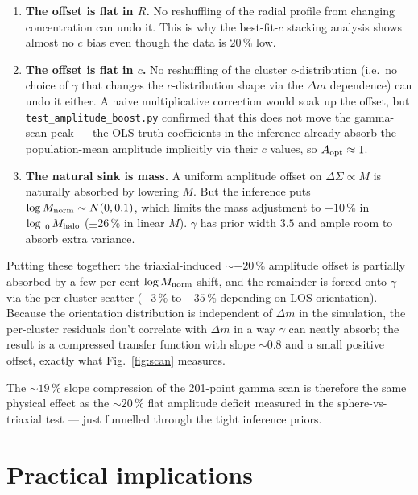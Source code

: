 \documentclass[11pt,a4paper]{article}
\newcommand{\DS}{\Delta\Sigma}
\newcommand{\dm}{\Delta m}
\begin{document}
\begin{enumerate}
\item \textbf{The offset is flat in $R$.}  No reshuffling of the radial
      profile from changing concentration can undo it.  This is why the
      best-fit-$c$ stacking analysis shows almost no $c$ bias even though
      the data is $20\,\%$ low.

\item \textbf{The offset is flat in $c$.}  No reshuffling of the cluster
      $c$-distribution (i.e.\ no choice of $\gamma$ that changes the
      $c$-distribution shape via the $\dm$ dependence) can undo it either.
      A naive multiplicative correction would soak up the offset, but
      \texttt{test\_amplitude\_boost.py} confirmed that this does not move
      the gamma-scan peak --- the OLS-truth coefficients in the inference
      already absorb the population-mean amplitude implicitly via their
      $c$ values, so $A_{\rm opt}\approx 1$.

\item \textbf{The natural sink is mass.}  A uniform amplitude offset on
      $\DS \propto M$ is naturally absorbed by lowering $M$.  But the
      inference puts $\log M_{\rm norm}\sim N(0,0.1)$, which limits the
      mass adjustment to $\pm 10\,\%$ in $\log_{10}M_{\rm halo}$
      ($\pm 26\,\%$ in linear $M$).  $\gamma$ has prior width $3.5$ and
      ample room to absorb extra variance.
\end{enumerate}

Putting these together: the triaxial-induced $\sim -20\,\%$ amplitude
offset is partially absorbed by a few per cent $\log M_{\rm norm}$ shift,
and the remainder is forced onto $\gamma$ via the per-cluster scatter
($-3\,\%$ to $-35\,\%$ depending on LOS orientation).  Because the
orientation distribution is independent of $\dm$ in the simulation, the
per-cluster residuals don't correlate with $\dm$ in a way $\gamma$ can
neatly absorb; the result is a compressed transfer function with slope
$\sim 0.8$ and a small positive offset, exactly what
Fig.~\ref{fig:scan} measures.

The $\sim 19\,\%$ slope compression of the 201-point gamma scan is therefore
the same physical effect as the $\sim 20\,\%$ flat amplitude deficit measured
in the sphere-vs-triaxial test --- just funnelled through the tight
inference priors.

\section{Practical implications}
\end{document}
